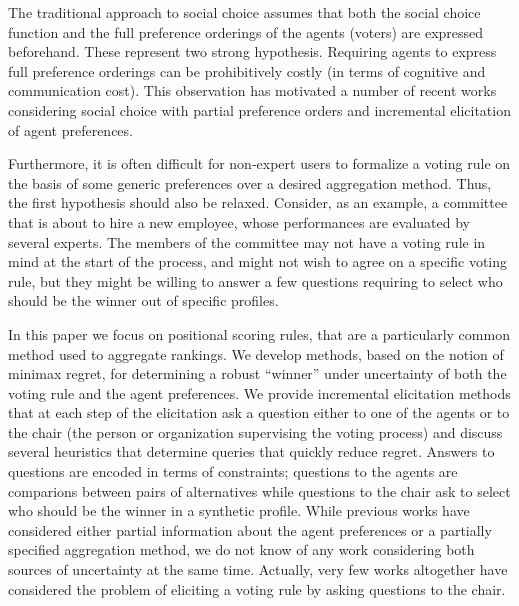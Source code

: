 \documentclass{article}
\begin{document}
The traditional approach to social choice assumes that both the social choice function and the full preference orderings of the agents (voters) are expressed beforehand. These represent two strong hypothesis.
Requiring agents to express full preference orderings can be prohibitively costly (in terms of cognitive and communication cost).
This observation has motivated a number of recent works considering social choice with partial preference orders and incremental elicitation of agent preferences. 

Furthermore, it is often difficult for non-expert users to formalize a voting rule on the basis of some generic preferences over a desired aggregation method. Thus, the first hypothesis should also be relaxed. 
Consider, as an example, a committee that is about to hire a new employee, whose performances are evaluated by several experts. The members of the committee may not have a voting rule in mind at the start of the process, and might not wish to agree on a specific voting rule, but they might be willing to answer a few questions requiring to select who should be the winner out of specific profiles. 

In this paper we focus on positional scoring rules, that are a particularly common method used to aggregate rankings. 
We develop methods, based on the notion of minimax regret, for determining a robust ``winner'' under uncertainty of both the voting rule and the agent preferences.
We provide incremental elicitation methods that 
at each step of the elicitation ask a question either to one of the agents or to the chair (the person or organization supervising the voting process) and discuss several heuristics that determine queries that quickly reduce regret. 
Answers to questions are encoded in terms of constraints; questions to the agents are comparions between pairs of alternatives while
questions to the chair ask  to select who should be the winner in a synthetic profile.
While previous works have considered either partial information about the agent preferences or a partially specified aggregation method, we do not know of any work considering both sources of uncertainty at the same time.
Actually, very few works altogether have considered the problem of eliciting a voting rule by asking questions to the chair.
\end{document}
